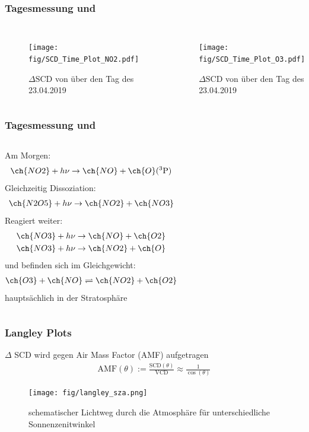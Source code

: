 \documentclass{beamer}
\begin{document}
\begin{frame}
    \frametitle{Tagesmessung  und }
	\begin{columns}
	  	\begin{figure}
	  		\texttt{[image: fig/SCD\_Time\_Plot\_NO2.pdf]}
    		\caption{$\Delta \text{SCD}$ von  über den Tag des 23.04.2019}
    		\label{fig:delta_SCD_time_NO2}
        \end{figure}
    	\begin{figure}
    		\texttt{[image: fig/SCD\_Time\_Plot\_O3.pdf]}
    		\caption{$\Delta \text{SCD}$ von  über den Tag des 23.04.2019}
    		\label{fig:delta_SCD_time_O3}
    	\end{figure}  		
    \end{columns}
\end{frame}

\begin{frame}
    \frametitle{Tagesmessung  und }
    \begin{columns}
    	Am Morgen:
    	\begin{align}
    		\ch{NO2} + h \nu \to \ch{NO} + \ch{O}(^3\text{P})
    	\end{align}
    \pause
    	Gleichzeitig Dissoziation:
    	\begin{align}
    		\ch{N2O5} + h \nu \to \ch{NO2} + \ch{NO3}
    	\end{align}
    \pause
    	Reagiert weiter:
    	\begin{align}
    		\ch{NO3} + h \nu \to \ch{NO} + \ch{O2}\\
    		\ch{NO3} + h \nu \to \ch{NO2} + \ch{O}
    	\end{align}
    \pause	
      	 und  befinden sich im Gleichgewicht:
      		\begin{align}
      			\ch{O3} + \ch{NO} \rightleftharpoons \ch{NO2} + \ch{O2}
      		\end{align}
      	 hauptsächlich in der Stratosphäre	
    \end{columns}
\end{frame}

\begin{frame}
    \frametitle{Langley Plots}
    $\Delta$ SCD wird gegen Air Mass Factor (AMF) aufgetragen\\
    
    \begin{align}
        \text{AMF}(\theta) := \frac{\text{SCD}(\theta)}{\text{VCD}} \approx \frac{1}{\cos (\theta)}
    \end{align}
    
    \begin{figure}
        \texttt{[image: fig/langley\_sza.png]}
        \caption{schematischer Lichtweg durch die Atmosphäre für unterschiedliche Sonnenzenitwinkel \cite{atm_script}}
    \end{figure}
\end{frame}
\end{document}
